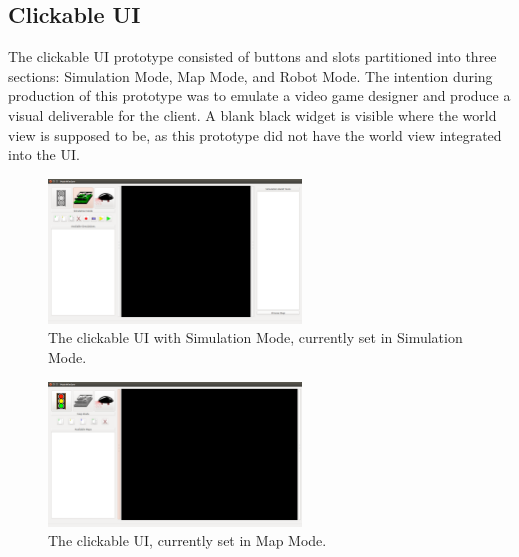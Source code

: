 \subsection{Clickable UI}

The clickable UI prototype consisted of buttons and slots partitioned into three sections: Simulation Mode, Map Mode, and Robot Mode. The intention during production of this prototype was to emulate a video game designer and produce a visual deliverable for the client. A blank black widget is visible where the world view is supposed to be, as this prototype did not have the world view integrated into the UI.\newline\newline\newline
\newline\newline\newline
\newline\newline\newline

\begin{figure}[H]
\begin{center}
\includegraphics[width=0.60\textwidth]{./Images/Sprint1_clickableUI_SimulationMode}
\end{center}
\caption{The clickable UI with Simulation Mode, currently set in Simulation Mode.  \label{clickableuisimulation}}
\end{figure}

\begin{figure}[H]
\begin{center}
\includegraphics[width=0.60\textwidth]{./Images/Sprint1_clickableUI_MapMode}
\end{center}
\caption{The clickable UI, currently set in Map Mode. \label{clickableuimap}}
\end{figure}

